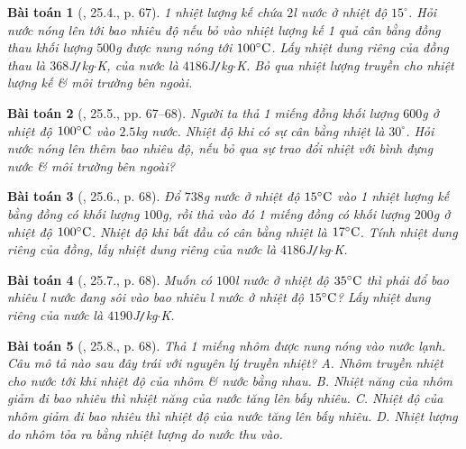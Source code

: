 \documentclass{article}
\newtheorem{baitoan}{Bài toán}
\begin{document}
\begin{baitoan}[\cite{SBT_Vat_Ly_8}, 25.4., p. 67]
	1 nhiệt lượng kế chứa $2$\emph{l} nước ở nhiệt độ $15^\circ$. Hỏi nước nóng lên tới bao nhiêu độ nếu bỏ vào nhiệt lượng kế 1 quả cân bằng đồng thau khối lượng $500$\emph{g} được nung nóng tới $100^\circ{\rm C}$. Lấy nhiệt dung riêng của đồng thau là $368$\emph{J\texttt{/}kg$\cdot$K}, của nước là $4186$\emph{J\texttt{/}kg$\cdot$K}. Bỏ qua nhiệt lượng truyền cho nhiệt lượng kế \& môi trường bên ngoài.
\end{baitoan}

\begin{baitoan}[\cite{SBT_Vat_Ly_8}, 25.5., pp. 67--68]
	Người ta thả 1 miếng đồng khối lượng $600$\emph{g} ở nhiệt độ $100^\circ{\rm C}$ vào $2.5$\emph{kg} nước. Nhiệt độ khi có sự cân bằng nhiệt là $30^\circ$. Hỏi nước nóng lên thêm bao nhiêu độ, nếu bỏ qua sự trao đổi nhiệt với bình đựng nước \& môi trường bên ngoài?
\end{baitoan}

\begin{baitoan}[\cite{SBT_Vat_Ly_8}, 25.6., p. 68]
	Đổ $738$\emph{g} nước ở nhiệt độ $15^\circ{\rm C}$ vào 1 nhiệt lượng kế bằng đồng có khối lượng $100$\emph{g}, rồi thả vào đó 1 miếng đồng có khối lượng $200$\emph{g} ở nhiệt độ $100^\circ{\rm C}$. Nhiệt độ khi bắt đầu có cân bằng nhiệt là $17^\circ{\rm C}$. Tính nhiệt dung riêng của đồng, lấy nhiệt dung riêng của nước là $4186$\emph{J\texttt{/}kg$\cdot$K}.
\end{baitoan}

\begin{baitoan}[\cite{SBT_Vat_Ly_8}, 25.7., p. 68]
	Muốn có $100$\emph{l} nước ở nhiệt độ $35^\circ{\rm C}$ thì phải đổ bao nhiêu \emph{l} nước đang sôi vào bao nhiêu \emph{l} nước ở nhiệt độ $15^\circ{\rm C}$? Lấy nhiệt dung riêng của nước là $4190$\emph{J\texttt{/}kg$\cdot$K}.
\end{baitoan}

\begin{baitoan}[\cite{SBT_Vat_Ly_8}, 25.8., p. 68]
	Thả 1 miếng nhôm được nung nóng vào nước lạnh. Câu mô tả nào sau đây trái với nguyên lý truyền nhiệt? {\sf A.} Nhôm truyền nhiệt cho nước tới khi nhiệt độ của nhôm \& nước bằng nhau. {\sf B.} Nhiệt năng của nhôm giảm đi bao nhiêu thì nhiệt năng của nước tăng lên bấy nhiêu. {\sf C.} Nhiệt độ của nhôm giảm đi bao nhiêu thì nhiệt độ của nước tăng lên bấy nhiêu. {\sf D.} Nhiệt lượng do nhôm tỏa ra bằng nhiệt lượng do nước thu vào.
\end{baitoan}
\end{document}
